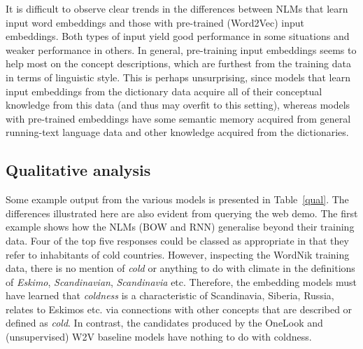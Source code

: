It is difficult to observe clear trends in the differences between NLMs that
learn input word embeddings and those with pre-trained (Word2Vec) input
embeddings. Both types of input yield good performance in some situations and
weaker performance in others. In general, pre-training input embeddings seems
to help most on the concept descriptions, which are furthest from the training
data in terms of linguistic style. This is perhaps unsurprising, since models
that learn input embeddings from the dictionary data acquire all of their
conceptual knowledge from this data (and thus may overfit to this setting),
whereas models with pre-trained embeddings have some semantic memory acquired
from general running-text language data and other knowledge acquired from the
dictionaries.



\subsection{Qualitative analysis}

Some example output from the various models is presented in Table~\ref{qual}. The differences illustrated here are also evident from querying the web demo. The first example shows how the NLMs (BOW and RNN) generalise beyond their training data. Four of the top five responses could be classed as appropriate in that they refer to inhabitants of cold countries. However, inspecting the WordNik training data, there is no mention of \emph{cold} or anything to do with climate in the definitions of \emph{Eskimo}, \emph{Scandinavian}, \emph{Scandinavia} etc. Therefore, the embedding models must have learned that \emph{coldness} is a characteristic of Scandinavia, Siberia, Russia, relates to Eskimos etc. via connections with other concepts that are described or defined as \emph{cold}. In contrast, the candidates produced by the OneLook and (unsupervised) W2V baseline models have nothing to do with coldness.

